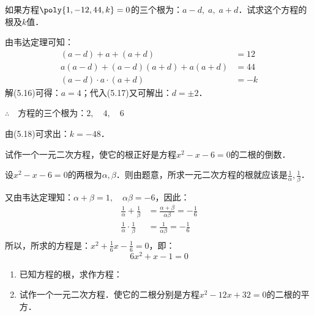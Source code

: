 \begin{example}
    如果方程$\poly{1,-12,44,k}=0$的三个根为：$a-d,\; a,\; a+d$．试求这个方程的根及$k$值．
\end{example}

\begin{solution}
    由韦达定理可知：
\begin{align}
(a-d)+a+(a+d)&=12\\
a(a-d)+(a-d)(a+d)+a(a+d)&=44\\
(a-d)\cdot a\cdot (a+d)&=-k
\end{align}
解(5.16)可得：$a=4$；代入(5.17)又可解出：$d=\pm 2$．

$\therefore\quad $方程的三个根为：$2,\quad 4,\quad 6$

由(5.18)可求出：$k=-48$．
\end{solution}

\begin{example}
试作一个一元二次方程，使它的根正好是方程$x^2-x-6=0$的二根的倒数．
\end{example}


\begin{solution}
设$x^2-x-6=0$的两根为$\alpha,\beta$．则由题意，所求一元二次方程的根就应该是$\frac{1}{\alpha},\frac{1}{\beta}$．

又由韦达定理知：$\alpha+\beta=1,\quad \alpha\beta=-6$，因此：
\[\begin{split}
    \frac{1}{\alpha}+\frac{1}{\beta}&=\frac{\alpha+\beta}{\alpha\beta}=-\frac{1}{6}\\
    \frac{1}{\alpha}\cdot \frac{1}{\beta}&=\frac{1}{\alpha\beta}=-\frac{1}{6}\\
\end{split}\]
所以，所求的方程是：$x^2+\frac{1}{6}x-\frac{1}{6}=0$，即：
\[ 6x^2+x-1=0 \]
\end{solution}


\begin{ex}
\begin{enumerate}
    \item 已知方程的根，求作方程：
    \begin{enumerate}
    \end{enumerate}
    \item 试作一个一元二次方程．使它的二根分别是方程$x^2-12x+32=0$的二根的平方．
\end{enumerate}
\end{ex}

